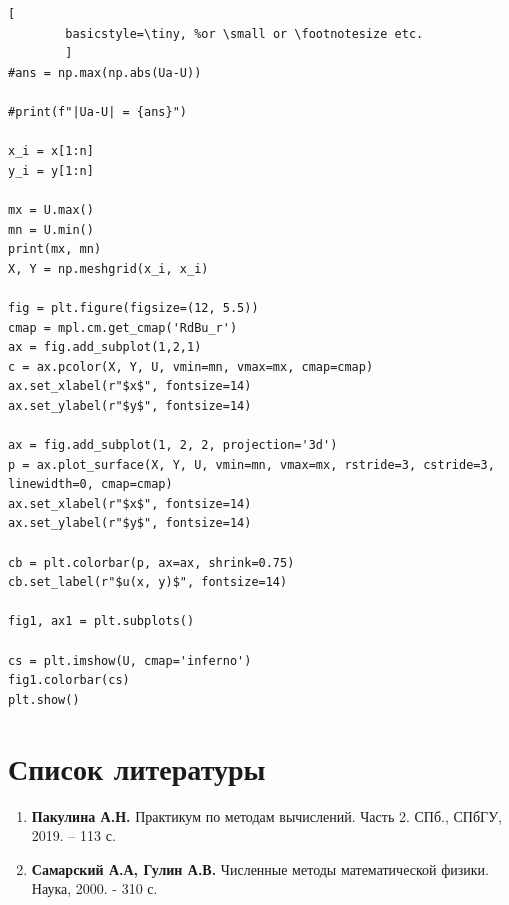 \documentclass[a4paper, 12pt]{article}
\begin{document}
\begin{lstlisting}[
		basicstyle=\tiny, %or \small or \footnotesize etc.
		]
#ans = np.max(np.abs(Ua-U))

#print(f"|Ua-U| = {ans}")

x_i = x[1:n]
y_i = y[1:n]

mx = U.max()
mn = U.min()
print(mx, mn)
X, Y = np.meshgrid(x_i, x_i)

fig = plt.figure(figsize=(12, 5.5))
cmap = mpl.cm.get_cmap('RdBu_r')
ax = fig.add_subplot(1,2,1)
c = ax.pcolor(X, Y, U, vmin=mn, vmax=mx, cmap=cmap)
ax.set_xlabel(r"$x$", fontsize=14)
ax.set_ylabel(r"$y$", fontsize=14)

ax = fig.add_subplot(1, 2, 2, projection='3d')
p = ax.plot_surface(X, Y, U, vmin=mn, vmax=mx, rstride=3, cstride=3, linewidth=0, cmap=cmap)
ax.set_xlabel(r"$x$", fontsize=14)
ax.set_ylabel(r"$y$", fontsize=14)

cb = plt.colorbar(p, ax=ax, shrink=0.75)
cb.set_label(r"$u(x, y)$", fontsize=14)

fig1, ax1 = plt.subplots()

cs = plt.imshow(U, cmap='inferno')
fig1.colorbar(cs)
plt.show()
	\end{lstlisting}
	\newpage
	\section{Список литературы}
	
	\begin{enumerate}
		\item \textbf{Пакулина А.Н.} Практикум по методам вычислений. Часть 2. СПб., СПбГУ, 2019. – 113 с.
		\item \textbf{Самарский А.А, Гулин А.В.} Численные методы математической физики. Наука, 2000. - 310 с.
	\end{enumerate}
	
	
	
\end{document}

